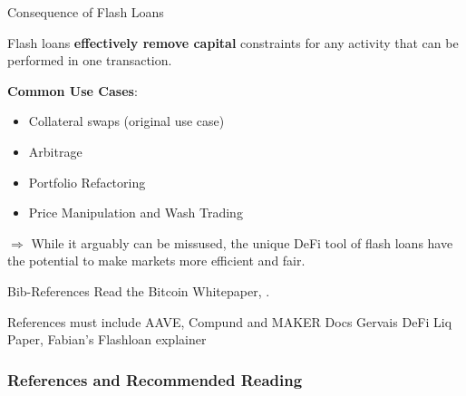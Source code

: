 \documentclass[handout]{beamer}
\begin{document}
\begin{frame}{Consequence of Flash Loans}

Flash loans \textbf{effectively remove capital} constraints for any activity that can be performed in one transaction.

\vspace{1em}

\textbf{Common Use Cases}:

\begin{itemize}
\item Collateral swaps (original use case)
\item Arbitrage
\item Portfolio Refactoring
\item Price Manipulation and Wash Trading

\end{itemize}

\vspace{2em}

$\Rightarrow$ While it arguably can be missused, the unique DeFi tool of flash loans have the potential to make markets more efficient and fair.


	
\end{frame}


\begin{frame}{Bib-References}
		Read the Bitcoin Whitepaper, \cite{nakamotoBitcoin2008}.
\end{frame}

\begin{frame}%

References must include AAVE, Compund and MAKER Docs
Gervais DeFi Liq Paper, Fabian's Flashloan explainer

\frametitle{References and Recommended Reading}
	
	
\end{frame}
\end{document}

